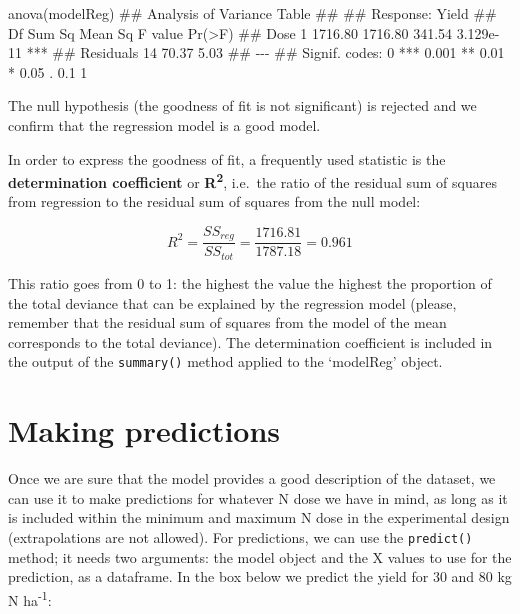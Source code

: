 \documentclass[a4paper,12pt,oneside]{book}
\newenvironment{Shaded}{\begin{snugshade}}{\end{snugshade}}
\newcommand{\DocumentationTok}[1]{#1}
\newcommand{\FunctionTok}[1]{#1}
\newcommand{\NormalTok}[1]{#1}
\begin{document}
\begin{Shaded}
\begin{Highlighting}[]
\FunctionTok{anova}\NormalTok{(modelReg)}
\DocumentationTok{\#\# Analysis of Variance Table}
\DocumentationTok{\#\# }
\DocumentationTok{\#\# Response: Yield}
\DocumentationTok{\#\#           Df  Sum Sq Mean Sq F value    Pr(\textgreater{}F)    }
\DocumentationTok{\#\# Dose       1 1716.80 1716.80  341.54 3.129e{-}11 ***}
\DocumentationTok{\#\# Residuals 14   70.37    5.03                      }
\DocumentationTok{\#\# {-}{-}{-}}
\DocumentationTok{\#\# Signif. codes:  0 \textquotesingle{}***\textquotesingle{} 0.001 \textquotesingle{}**\textquotesingle{} 0.01 \textquotesingle{}*\textquotesingle{} 0.05 \textquotesingle{}.\textquotesingle{} 0.1 \textquotesingle{} \textquotesingle{} 1}
\end{Highlighting}
\end{Shaded}

The null hypothesis (the goodness of fit is not significant) is rejected and we confirm that the regression model is a good model.

In order to express the goodness of fit, a frequently used statistic is the \textbf{determination coefficient} or \textbf{R\textsuperscript{2}}, i.e.~the ratio of the residual sum of squares from regression to the residual sum of squares from the null model:

\[R^2 = \frac{SS_{reg}}{SS_{tot}} = \frac{1716.81}{1787.18} = 0.961\]

This ratio goes from 0 to 1: the highest the value the highest the proportion of the total deviance that can be explained by the regression model (please, remember that the residual sum of squares from the model of the mean corresponds to the total deviance). The determination coefficient is included in the output of the \texttt{summary()} method applied to the `modelReg' object.

\hypertarget{making-predictions}{%
\section{Making predictions}\label{making-predictions}}

Once we are sure that the model provides a good description of the dataset, we can use it to make predictions for whatever N dose we have in mind, as long as it is included within the minimum and maximum N dose in the experimental design (extrapolations are not allowed). For predictions, we can use the \texttt{predict()} method; it needs two arguments: the model object and the X values to use for the prediction, as a dataframe. In the box below we predict the yield for 30 and 80 kg N ha\textsuperscript{-1}:
\end{document}
